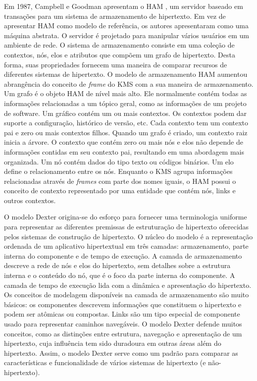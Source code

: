 Em 1987, Campbell e Goodman apresentam o HAM \cite{campbell1987ham}, um servidor baseado em transações para um sistema de armazenamento de hipertexto. Em vez de apresentar HAM como modelo de referência, os autores apresentaram como uma máquina abstrata. O servidor é projetado para manipular vários usuários em um ambiente de rede. O sistema de armazenamento consiste em uma coleção de contextos, nós, elos e atributos que compõem um grafo de hipertexto. Desta forma, suas propriedades fornecem uma maneira de comparar recursos de diferentes sistemas de hipertexto. O modelo de armazenamento HAM aumentou abrangência do conceito de \textit{frame} do KMS com a sua maneira de armazenamento. Um grafo é o objeto HAM de nível mais alto. Ele normalmente contém todas as informações relacionadas a um tópico geral, como as informações de um projeto de software. Um gráfico contém um ou mais contextos. Os contextos podem dar suporte a configuração, histórico de versão, etc. Cada contexto tem um contexto pai e zero ou mais contextos filhos. Quando um grafo é criado, um contexto raiz inicia a árvore. O contexto que contém zero ou mais nós e elos não depende de informações contidas em seu contexto pai, resultando em uma abordagem mais organizada. Um nó contém dados do tipo texto ou códigos binários. Um elo define o relacionamento entre os nós. Enquanto o KMS agrupa informações relacionadas através de \textit{frames} com parte dos nomes iguais, o HAM possui o conceito de contexto representado por uma entidade que contém nós, links e outros contextos. 

O modelo Dexter \cite{Halasz:1994:DHR:175235.175237} origina-se do esforço para fornecer uma terminologia uniforme para representar as diferentes premissas de estruturação de hipertexto oferecidas pelos sistemas de construção de hipertexto. O núcleo do modelo é a representação ordenada de um aplicativo hipertextual em três camadas: armazenamento, parte interna do componente e de tempo de execução. A camada de armazenamento descreve a rede de nós e elos do hipertexto, sem detalhes sobre a estrutura interna e o conteúdo do nó, que é o foco da parte interna do componente. A camada de tempo de execução lida com a dinâmica e apresentação do hipertexto. Os conceitos de modelagem disponíveis na camada de armazenamento são muito básicos: os componentes descrevem informações que constituem o hipertexto e podem ser atômicas ou compostas. Links são um tipo especial de componente usado para representar caminhos navegáveis. O modelo Dexter defende muitos conceitos, como as distinções entre estrutura, navegação e apresentação de um hipertexto, cuja influência tem sido duradoura em outras áreas além do hipertexto. Assim, o modelo Dexter serve como um padrão para comparar as características e funcionalidade de vários sistemas de hipertexto (e não-hipertexto). 


